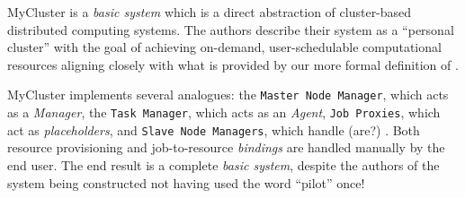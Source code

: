 \documentclass{sig-alternate}
\begin{document}


MyCluster is a \textit{basic \pilotjob system} which is a direct
abstraction of cluster-based distributed computing systems.
The authors describe their system
as a ``personal cluster'' with the goal of achieving on-demand,
user-schedulable computational resources aligning closely with what is
provided by our more formal definition of \pilotjobs.

MyCluster implements several \pilotjob analogues: the \texttt{Master
  Node Manager}, which acts as a \textit{\pilotjob Manager}, the
\texttt{Task Manager}, which acts as an \textit{\pilotjob Agent},
\texttt{Job Proxies}, which act as \textit{placeholders}, and
\texttt{Slave Node Managers}, which handle (are?) \textit{\pilotjob
  \cus}.  Both resource provisioning and job-to-resource \textit{bindings}
are handled manually by the end user.
The end result is a complete \textit{basic \pilotjob system}, despite the
authors of the system being constructed not having used the word ``pilot''
once!~\cite{1652061}  
\end{document}
